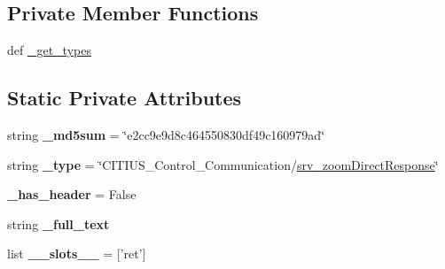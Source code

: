 \subsection*{\-Private \-Member \-Functions}
\begin{DoxyCompactItemize}
\item 
def \hyperlink{class_c_i_t_i_u_s___control___communication_1_1srv_1_1__srv__zoom_direct_1_1srv__zoom_direct_response_a2c89f17bf80febdda47239655a146fe9}{\-\_\-get\-\_\-types}
\end{DoxyCompactItemize}
\subsection*{\-Static \-Private \-Attributes}
\begin{DoxyCompactItemize}
\item 
\hypertarget{class_c_i_t_i_u_s___control___communication_1_1srv_1_1__srv__zoom_direct_1_1srv__zoom_direct_response_aec629059799d54785aabb022c7a455a6}{string {\bfseries \-\_\-md5sum} = \char`\"{}e2cc9e9d8c464550830df49c160979ad\char`\"{}}\label{class_c_i_t_i_u_s___control___communication_1_1srv_1_1__srv__zoom_direct_1_1srv__zoom_direct_response_aec629059799d54785aabb022c7a455a6}

\item 
\hypertarget{class_c_i_t_i_u_s___control___communication_1_1srv_1_1__srv__zoom_direct_1_1srv__zoom_direct_response_a06b2594a70ce9ba0933c1b5f4d879cd2}{string {\bfseries \-\_\-type} = \char`\"{}\-C\-I\-T\-I\-U\-S\-\_\-\-Control\-\_\-\-Communication/\hyperlink{class_c_i_t_i_u_s___control___communication_1_1srv_1_1__srv__zoom_direct_1_1srv__zoom_direct_response}{srv\-\_\-zoom\-Direct\-Response}\char`\"{}}\label{class_c_i_t_i_u_s___control___communication_1_1srv_1_1__srv__zoom_direct_1_1srv__zoom_direct_response_a06b2594a70ce9ba0933c1b5f4d879cd2}

\item 
\hypertarget{class_c_i_t_i_u_s___control___communication_1_1srv_1_1__srv__zoom_direct_1_1srv__zoom_direct_response_a82cdf55e1eadab7393628ef4cae18191}{{\bfseries \-\_\-has\-\_\-header} = \-False}\label{class_c_i_t_i_u_s___control___communication_1_1srv_1_1__srv__zoom_direct_1_1srv__zoom_direct_response_a82cdf55e1eadab7393628ef4cae18191}

\item 
string {\bfseries \-\_\-full\-\_\-text}
\item 
\hypertarget{class_c_i_t_i_u_s___control___communication_1_1srv_1_1__srv__zoom_direct_1_1srv__zoom_direct_response_a1602f9ed47a6e5fa390d2d9fe0bc8c22}{list {\bfseries \-\_\-\-\_\-slots\-\_\-\-\_\-} = \mbox{[}'ret'\mbox{]}}\label{class_c_i_t_i_u_s___control___communication_1_1srv_1_1__srv__zoom_direct_1_1srv__zoom_direct_response_a1602f9ed47a6e5fa390d2d9fe0bc8c22}


\end{DoxyCompactItemize}

